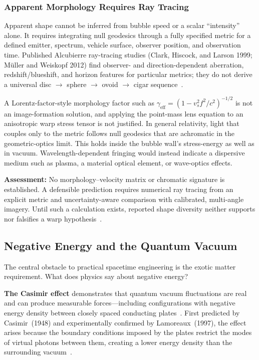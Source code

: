 \documentclass[aps,prd,twocolumn,superscriptaddress,nofootinbib,floatfix]{revtex4-2}
\begin{document}
\subsubsection{Apparent Morphology Requires Ray Tracing}\label{sec:morphology}

Apparent shape cannot be inferred from bubble speed or a scalar ``intensity''
alone. It requires integrating null geodesics through a fully specified metric for
a defined emitter, spectrum, vehicle surface, observer position, and observation
time. Published Alcubierre ray-tracing studies (Clark, Hiscock, and Larson 1999;
M\"uller and Weiskopf 2012) find observer- and direction-dependent aberration,
redshift/blueshift, and horizon features for particular metrics; they do not
derive a universal disc $\to$ sphere $\to$ ovoid $\to$ cigar
sequence~\cite{ClarkHiscockLarson1999,MullerWeiskopf2012}.

A Lorentz-factor-style morphology factor such as
$\gamma_{\mathrm{eff}}=(1-v_{s}^{2}f^{2}/c^{2})^{-1/2}$ is not an image-formation
solution, and applying the point-mass lens equation to an anisotropic warp stress
tensor is not justified. In general relativity, light that couples only to the
metric follows null geodesics that are achromatic in the geometric-optics limit.
This holds inside the bubble wall's stress-energy as well as in vacuum.
Wavelength-dependent fringing would instead indicate a dispersive medium such as
plasma, a material optical element, or wave-optics effects.

\textbf{Assessment:} No morphology--velocity matrix or chromatic signature is
established. A defensible prediction requires numerical ray tracing from an
explicit metric and uncertainty-aware comparison with calibrated, multi-angle
imagery. Until such a calculation exists, reported shape diversity neither
supports nor falsifies a warp
hypothesis~\cite{Alcubierre1994,MTW1973,Wald1984,DIRD_Puthoff}.

\subsection{Negative Energy and the Quantum Vacuum}\label{sec:negative-energy}

The central obstacle to practical spacetime engineering is the exotic matter
requirement. What does physics say about negative energy?

\textbf{The Casimir effect} demonstrates that quantum vacuum fluctuations are real
and can produce measurable forces---including configurations with negative energy
density between closely spaced conducting plates~\cite{Casimir1948}. First
predicted by Casimir~(1948) and experimentally confirmed by Lamoreaux~(1997), the
effect arises because the boundary conditions imposed by the plates restrict the
modes of virtual photons between them, creating a lower energy density than the
surrounding vacuum~\cite{Lamoreaux1997}.
\end{document}
